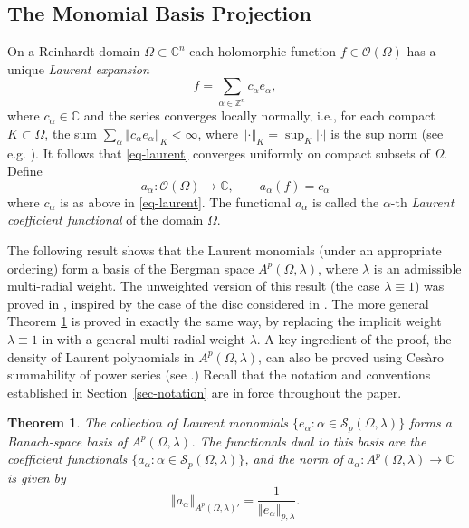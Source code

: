 \documentclass[letterpaper,11pt,reqno]{amsart}
\theoremstyle{plain}
\newtheorem{theorem}[equation]{Theorem}
\theoremstyle{definition}
\theoremstyle{remark}
\theoremstyle{remark}
\numberwithin{equation}{section}
\newcommand{\abs}[1]{\left\vert#1\right\vert}
\newcommand{\norm}[1]{\left\Vert#1\right\Vert}
\newcommand{\cs}{{\mathcal S}}
\newcommand{\cx}{{\mathbb C}}
\newcommand{\C}{{\mathbb C}}
\newcommand{\Z}{{\mathbb Z}}
\begin{document}
\subsection{The Monomial Basis Projection}
On a Reinhardt domain $\Omega\subset \cx^n$ each holomorphic function $f\in\mathcal{O}(\Omega)$ has a unique \emph{Laurent expansion}
\begin{equation}\label{eq-laurent}
    f=\sum_{\alpha\in \Z^n} c_\alpha e_\alpha,
\end{equation}
where  $c_\alpha\in\cx$ and the series converges locally normally, i.e., for each compact $K\subset \Omega$, the sum $\sum_\alpha \norm{c_\alpha e_\alpha}_K<\infty$, where $\norm{\cdot}_K = \sup_K\abs{\cdot}$ is the sup norm (see e.g.\!\! \cite{range}).
It follows that \eqref{eq-laurent} converges 
uniformly on compact subsets of $\Omega$. 
Define 
\begin{equation}\label{eq-laurentcoefficient}
    a_\alpha:\mathcal{O}(\Omega)\to \cx, \qquad a_\alpha(f)= c_\alpha
\end{equation}
where $c_\alpha$ is as above in \eqref{eq-laurent}. The functional $a_\alpha$ is called the $\alpha$-th \emph{Laurent coefficient functional} of the domain $\Omega$.

The following result shows that the Laurent monomials (under an appropriate ordering) form a  basis of the Bergman space $A^p(\Omega,\lambda)$, where $\lambda$ is an admissible multi-radial weight. 
The unweighted version of this result (the case $\lambda\equiv 1$) was proved in \cite{ChEdMc19}, inspired by the case of the disc considered in \cite{zhu1991}. 
The more general Theorem \ref{T:monomials-form-a-Schauder-basis} is proved in exactly the same way, by replacing the implicit weight $\lambda \equiv 1$ in \cite[Theorem~3.11]{ChEdMc19} with a general multi-radial weight $\lambda$. 
A key ingredient of the proof, the density of Laurent polynomials in $A^p(\Omega, \lambda)$, can also be proved
using Cesàro summability of power series (see \cite[Theorem~2.5]{chakdawn}.)
Recall that the notation and  conventions established in Section~\ref{sec-notation} are in force throughout the paper.
 
\begin{theorem}\label{T:monomials-form-a-Schauder-basis}
The collection of Laurent monomials $\{e_\alpha: \alpha \in \cs_p(\Omega,\lambda) \}$ forms a Banach-space basis of $A^p(\Omega,\lambda)$. 
The functionals dual to this basis are the coefficient functionals $\{a_\alpha: \alpha \in \cs_p(\Omega,\lambda) \}$, and the norm of $a_\alpha:A^p(\Omega, \lambda) \to \C$ is given by
\begin{equation}\label{eq-aalphanorm} 
\norm{{a_\alpha}}_{A^p(\Omega, \lambda)'} = \frac{1}{\norm{e_\alpha}_{p,\lambda}}.
\end{equation}
\end{theorem}
\end{document}
